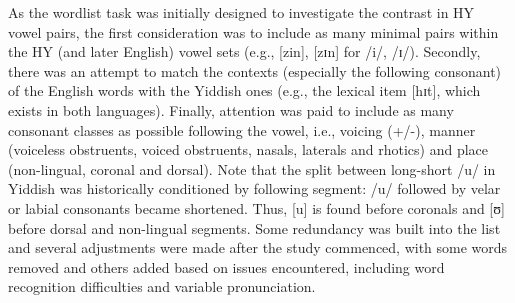 \documentclass[output=paper]{langsci/langscibook}
\begin{document}
\begin{table}
\end{table}

As the wordlist task was initially designed to investigate the contrast in HY vowel pairs, the first consideration was to include as many minimal pairs within the HY (and later English) vowel sets (e.g., {[}zin{]}, {[}zɪn{]} for {/i/, /ɪ/}). Secondly, there was an attempt to match the contexts (especially the following consonant) of the English words with the Yiddish ones (e.g., the lexical item {[}hɪt{]}, which exists in both languages). Finally, attention was paid to include as many consonant classes as possible following the vowel, i.e., voicing (+/-), manner (voiceless obstruents, voiced obstruents, nasals, laterals and rhotics) and place (non-lingual, coronal and dorsal). Note that the split between long-short /u/ in Yiddish was historically conditioned by following segment: /u/ followed by velar or labial consonants became shortened. Thus, {[}u{]} is found before coronals and {[}ʊ{]} before dorsal and non-lingual segments. 
Some redundancy was built into the list and several adjustments were made after the study commenced, with some words removed and others added based on issues encountered, including word recognition difficulties and variable pronunciation.


{\sloppy\printbibliography[heading=subbibliography,notkeyword=this]}
\end{document}
